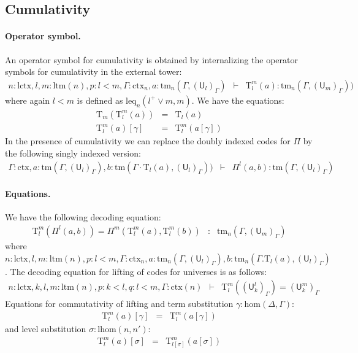 \documentclass[submission,copyright,creativecommons]{eptcs}
\newcommand{\UU}{\mathsf{U}}
\def\lhom{\mathrm{lhom}}
\def\UU{\mathsf{U}}
\newcommand{\N}{\mathsf{N}}
\def\Pihat{\Pi}
\def\sub{\mathrm{hom}}
\def\lctx{\mathrm{lctx}}
\def\ltm{\mathrm{ltm}}
\def\leq{\mathrm{leq}}
\newcommand{\ctx}{\mathrm{ctx}}
\newcommand{\tm}{\mathrm{tm}}
\def\U{\mathsf{U}}
\newcommand{\Ta}{\mathrm{T}}
\begin{document}
\subsection{Cumulativity}\label{cumulativity}
\paragraph{Operator symbol.}
An operator symbol for cumulativity is obtained by internalizing the operator symbols for cumulativity in the external tower:
\begin{eqnarray*}
n : \lctx, l,m : \ltm(n), p : l < m, \Gamma : \ctx_n, a : \tm_n(\Gamma,(\U_{l})_\Gamma) &\vdash& {\Ta^m_{l}}(a) : \tm_n(\Gamma,(\U_{m})_\Gamma))
\end{eqnarray*}
where again $l < m$ is defined as $\leq_n(l^+ \vee m, m)$. We have the equations:
\begin{eqnarray*}
\Ta_m(\Ta^m_{l}(a)) &=& \Ta_l(a)\\
\Ta^m_{l}(a)[\gamma] &=& \Ta^m_{l}(a[\gamma])
\end{eqnarray*}
In the presence of cumulativity we can replace the doubly indexed codes for $\Pi$ by the following singly indexed version:
\begin{eqnarray*}
\Gamma : \ctx,
a : \tm(\Gamma,(\U_{l})_\Gamma),
b :  \tm(\Gamma \cdot \Ta_{l}(a), (\U_{l})_\Gamma))
&\vdash&
 \Pihat^{l}(a,b) : \tm(\Gamma,(\U_{l})_\Gamma)
 \end{eqnarray*}
\paragraph{Equations.}
We have the following decoding equation:
\begin{eqnarray*}
\Ta^{m}_{l}(\Pi^{l}(a,b)) = \Pi^{m}(\Ta^m_l(a),\Ta^{m}_{l}(b)) &:& \tm_n(\Gamma,(\UU_{m})_\Gamma)
\end{eqnarray*}
where $n: \lctx,l,m : \ltm(n), p: l < m, \Gamma : \ctx_n, a : \tm_n(\Gamma,(\UU_l)_\Gamma), b : \tm_n(\Gamma.\Ta_l(a),(\UU_{l})_\Gamma)$.
The decoding equation for lifting of codes for universes is as follows:
\begin{eqnarray*}
n : \lctx, k, l, m : \ltm(n), p : k < l, q : l < m, \Gamma : \ctx(n) &\vdash& \Ta^m_l((\UU^l_k)_\Gamma) = (\UU^m_k)_\Gamma
\end{eqnarray*}
Equations for commutativity of lifting and term substitution $\gamma : \sub(\Delta,\Gamma)$:
\begin{eqnarray*}
\Ta^m_l(a) [ \gamma ] &=& \Ta^m_l(a[ \gamma ] )
\end{eqnarray*}
and level substitution $\sigma : \lhom(n,n')$:
\begin{eqnarray*}
\Ta^m_l(a) [ \sigma ] &=& \Ta^m_{l[\sigma]}(a[ \sigma ] )
\end{eqnarray*}
\end{document}
